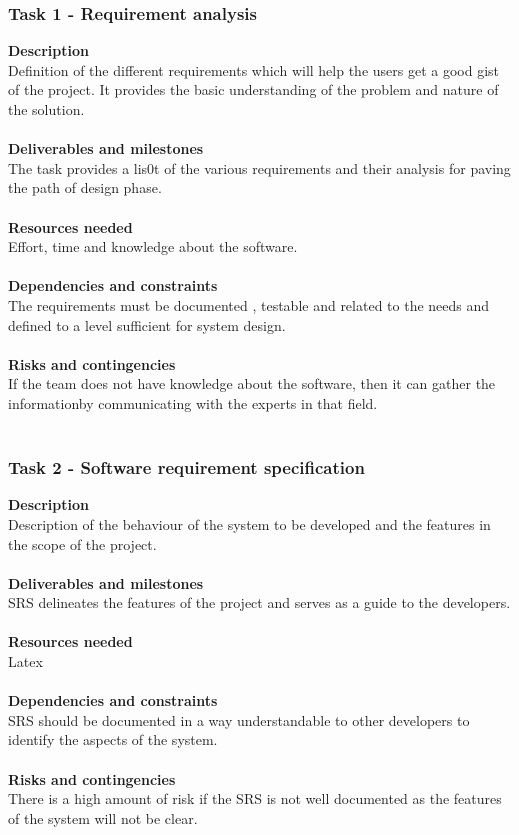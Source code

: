 \documentclass[10pt]{article}
\begin{document}
\subsubsection{Task 1 - Requirement analysis}
\textbf{Description}\\
Definition of the different requirements which will help the users get a good gist of the project. It provides the basic understanding of the problem and nature of the solution. \\ \\
\textbf{Deliverables and milestones}\\
The task provides a lis0t of the various requirements and their analysis for paving the path of design phase.\\ \\
\textbf{Resources needed}\\
Effort, time and knowledge about the software.\\ \\
\textbf{Dependencies and constraints}\\
The requirements must be documented , testable and related to the needs and defined to a level sufficient for system design.\\ \\
\textbf{Risks and contingencies}\\
If the team does not have knowledge about the software, then it can gather the informationby communicating with the experts in that field.\\ \\

\subsubsection{Task 2 - Software requirement specification}
\textbf{Description}\\
Description of the behaviour of the system to be developed and the features in the scope of the project. \\ \\
\textbf{Deliverables and milestones}\\
SRS delineates the features of the project and serves as a guide to the developers.\\ \\
\textbf{Resources needed}\\
Latex\\ \\
\textbf{Dependencies and constraints}\\
SRS should be documented in a way understandable to other developers to identify the aspects of the system.\\ \\
\textbf{Risks and contingencies}\\
There is a high amount of risk if the SRS is not well documented as the features of the system will not be clear.
\newpage
\end{document}
